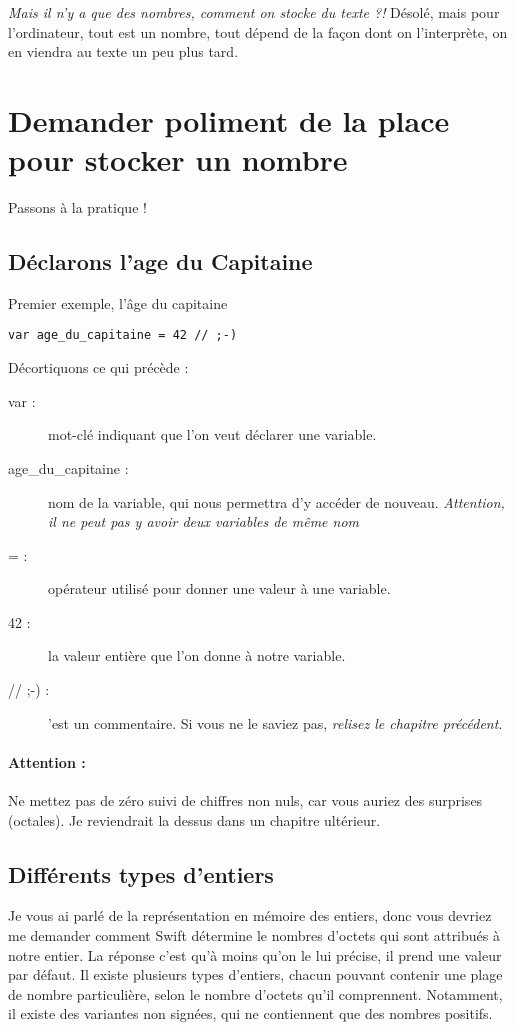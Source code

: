 \emph{Mais il n'y a que des nombres, comment on stocke du texte ?!}
Désolé, mais pour l'ordinateur, tout est un nombre,
tout dépend de la façon dont on l'interprète,
on en viendra au texte un peu plus tard.

\section{Demander poliment de la place pour stocker un nombre}
Passons à la pratique !

\subsection{Déclarons l'age du Capitaine}

\begin{listing}[h]
\caption{Premier exemple, l'âge du capitaine}
\begin{verbatim}
var age_du_capitaine = 42 // ;-)
\end{verbatim}
\end{listing}

Décortiquons ce qui précède :
\begin{description}
\item[var :] mot-clé indiquant que l'on veut déclarer une variable.
\item[age\_du\_capitaine :] nom de la variable,
qui nous permettra d'y accéder de nouveau.
\emph{Attention, il ne peut pas y avoir deux variables de même nom}
\item[= :] opérateur utilisé pour donner une valeur à une variable.
\item[42 :] la valeur entière que l'on donne à notre variable.
\item[// ;-) :] 'est un commentaire. Si vous ne le saviez pas, \emph{relisez le chapitre précédent}.
\end{description}
\paragraph{Attention :}
Ne mettez pas de zéro suivi de chiffres non nuls,
car vous auriez des surprises (octales).
Je reviendrait la dessus dans un chapitre ultérieur.
\subsection{Différents types d'entiers}
Je vous ai parlé de la représentation en mémoire des entiers,
donc vous devriez me demander comment Swift détermine
le nombres d'octets qui sont attribués à notre entier.
La réponse c'est qu'à moins qu'on le lui précise,
il prend une valeur par défaut.
Il existe plusieurs types d'entiers,
chacun pouvant contenir une plage de nombre particulière,
selon le nombre d'octets qu'il comprennent.
Notamment, il existe des variantes non signées,
qui ne contiennent que des nombres positifs.

